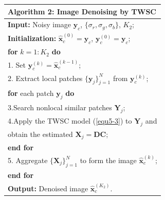 \begin{table}[htb]
\begin{tabular}{l}
\hline
\textbf{Algorithm 2}: Image Denoising by TWSC
\\
\hline
\textbf{Input:} Noisy image $\bm{y}_{c}$, $\{\sigma_{r}, \sigma_{g}, \sigma_{b}\}$, $K_{2}$;
\\
\textbf{Initialization:} $\hat{\bm{x}}_{c}^{(0)}=\bm{y}_{c}$, $\bm{y}_{c}^{(0)}=\bm{y}_{c}$;
\\
\textbf{for} $k = 1:K_{2}$ \textbf{do}
\\
1. Set $\bm{y}_{c}^{(k)}=\hat{\bm{x}}_{c}^{(k-1)}$;
\\
2. Extract local patches $\{\bm{y}_{j}\}_{j=1}^{N}$ from $\bm{y}_{c}^{(k)}$;
\\
\quad\textbf{for} each patch $\bm{y}_{j}$ \textbf{do}
\\
3.\quad Search nonlocal similar patches $\bm{Y}_{j}$;
\\
4.\quad Apply the TWSC model (\ref{equ5-3}) to $\bm{Y}_{j}$ and
\\
\quad \quad 
obtain the estimated $\bm{X}_{j}=\bm{D}\bm{C}$;
\\
\quad\textbf{end for}
\\
5. Aggregate $\{\bm{X}_{j}\}_{j=1}^{N}$ to form the image $\hat{\bm{x}}_{c}^{(k)}$;
\\
\textbf{end for}
\\
\textbf{Output:} Denoised image $\hat{\bm{x}}_{c}^{(K_{2})}$.
\\
\hline
\end{tabular}     
\end{table}


